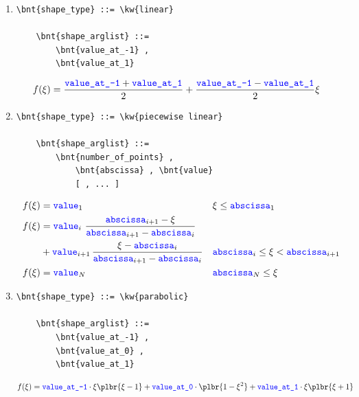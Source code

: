 \begin{enumerate}
    \item {}
\begin{Verbatim}[commandchars=\\\{\}]
    \bnt{shape_type} ::= \kw{linear}

    \bnt{shape_arglist} ::=
        \bnt{value_at_-1} , 
        \bnt{value_at_1}
\end{Verbatim}
\begin{align}
	f(\xi) &= \frac{\textcolor{blue}{\texttt{value\_at\_-1}} + \textcolor{blue}{\texttt{value\_at\_1}}}{2}
		+ \frac{\textcolor{blue}{\texttt{value\_at\_-1}} - \textcolor{blue}{\texttt{value\_at\_1}}}{2} \xi
\end{align}

    \item {}
\begin{Verbatim}[commandchars=\\\{\}]
    \bnt{shape_type} ::= \kw{piecewise linear}

    \bnt{shape_arglist} ::=
        \bnt{number_of_points} , 
            \bnt{abscissa} , \bnt{value}
            [ , ... ]
\end{Verbatim}
\begin{subequations}
\begin{align}
	f(\xi) &= \textcolor{blue}{\texttt{value}}_1	&& \xi \le \textcolor{blue}{\texttt{abscissa}}_1
	\\
	f(\xi) &=
		\textcolor{blue}{\texttt{value}}_i \, \, \frac{\textcolor{blue}{\texttt{abscissa}}_{i+1} - \xi}{\textcolor{blue}{\texttt{abscissa}}_{i+1} - \textcolor{blue}{\texttt{abscissa}}_i}
	\nonumber \\
		&
		+ \textcolor{blue}{\texttt{value}}_{i+1} \, \frac{\xi - \textcolor{blue}{\texttt{abscissa}}_i}{\textcolor{blue}{\texttt{abscissa}}_{i+1} - \textcolor{blue}{\texttt{abscissa}}_i}
		&& \textcolor{blue}{\texttt{abscissa}}_i \le \xi < \textcolor{blue}{\texttt{abscissa}}_{i+1}
	\\
	f(\xi) &= \textcolor{blue}{\texttt{value}}_N	&& \textcolor{blue}{\texttt{abscissa}}_N \le \xi
\end{align}
\end{subequations}

    \item {}
\begin{Verbatim}[commandchars=\\\{\}]
    \bnt{shape_type} ::= \kw{parabolic}

    \bnt{shape_arglist} ::=
        \bnt{value_at_-1} , 
        \bnt{value_at_0} , 
        \bnt{value_at_1}
\end{Verbatim}
\begin{align}
	f(\xi) &= \nt{value\_at\_-1} \cdot \xi\plbr{\xi - 1}
		+ \nt{value\_at\_0} \cdot \plbr{1 - \xi^2}
		+ \nt{value\_at\_1} \cdot \xi\plbr{\xi + 1}
\end{align}

\end{enumerate}
